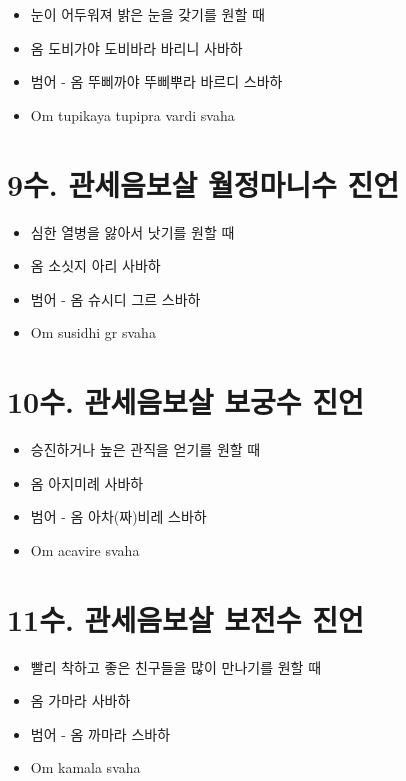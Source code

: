 \documentclass[12pt, a4paper, oneside]{book}
\let\stdsection\section
\renewcommand\section{\newpage\stdsection}
\begin{document}
			\begin{itemize}
			\item 눈이 어두워져 밝은 눈을 갖기를 원할 때
			\item 옴 도비가야 도비바라 바리니 사바하
			\item 범어 - 옴 뚜삐까야 뚜삐뿌라 바르디 스바하
			\item Om tupikaya tupipra vardi svaha
			\end{itemize}





\section{9수. 관세음보살 월정마니수 진언}

			\begin{itemize}
			\item 심한 열병을 앓아서 낫기를 원할 때
			\item 옴 소싯지 아리 사바하
			\item 범어 - 옴 슈시디 그르 스바하
			\item Om susidhi gr svaha
			\end{itemize}





\section{10수. 관세음보살 보궁수 진언}

			\begin{itemize}
			\item 승진하거나 높은 관직을 얻기를 원할 때
			\item 옴 아지미례 사바하
			\item 범어 - 옴 아차(짜)비레 스바하
			\item Om acavire svaha 
			\end{itemize}



 


\section{11수. 관세음보살 보전수 진언 }

			\begin{itemize}
			\item 빨리 착하고 좋은 친구들을 많이 만나기를 원할 때
			\item 옴 가마라 사바하
			\item 범어 - 옴 까마라 스바하
			\item Om kamala svaha
			\end{itemize}
\end{document}
